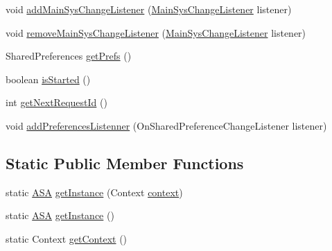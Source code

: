 \begin{DoxyCompactItemize}
\item 
void \hyperlink{classpt_1_1lsts_1_1asa_1_1ASA_a7af9bbb412bf2abea4dd19561db8c510}{add\+Main\+Sys\+Change\+Listener} (\hyperlink{interfacept_1_1lsts_1_1asa_1_1listenners_1_1MainSysChangeListener}{Main\+Sys\+Change\+Listener} listener)
\item 
void \hyperlink{classpt_1_1lsts_1_1asa_1_1ASA_ab84be20f79f7bd52a961b7ffac367aaa}{remove\+Main\+Sys\+Change\+Listener} (\hyperlink{interfacept_1_1lsts_1_1asa_1_1listenners_1_1MainSysChangeListener}{Main\+Sys\+Change\+Listener} listener)
\item 
Shared\+Preferences \hyperlink{classpt_1_1lsts_1_1asa_1_1ASA_a8714046f8afa82d2eda8d9e0ae22ffb5}{get\+Prefs} ()
\item 
boolean \hyperlink{classpt_1_1lsts_1_1asa_1_1ASA_aaef92561b2ee1d4a1e5b60c32b1f22ea}{is\+Started} ()
\item 
int \hyperlink{classpt_1_1lsts_1_1asa_1_1ASA_acf6f750e88c4c0c8b6fa792196f84867}{get\+Next\+Request\+Id} ()
\item 
void \hyperlink{classpt_1_1lsts_1_1asa_1_1ASA_adbff2f21137ed321d401ef09921f8910}{add\+Preferences\+Listenner} (On\+Shared\+Preference\+Change\+Listener listener)
\end{DoxyCompactItemize}
\subsection*{Static Public Member Functions}
\begin{DoxyCompactItemize}
\item 
static \hyperlink{classpt_1_1lsts_1_1asa_1_1ASA}{A\+S\+A} \hyperlink{classpt_1_1lsts_1_1asa_1_1ASA_a688c04ccf2e4c837925dd73d84f8b9bf}{get\+Instance} (Context \hyperlink{classpt_1_1lsts_1_1asa_1_1ASA_ad16e2c7db27b0a63a471c62f1fdcc1df}{context})
\item 
static \hyperlink{classpt_1_1lsts_1_1asa_1_1ASA}{A\+S\+A} \hyperlink{classpt_1_1lsts_1_1asa_1_1ASA_a2be22113af4d4bbfd6061c5292760c54}{get\+Instance} ()
\item 
static Context \hyperlink{classpt_1_1lsts_1_1asa_1_1ASA_ab5ab0fc8f101a27c96444bd02b4c0672}{get\+Context} ()
\end{DoxyCompactItemize}
